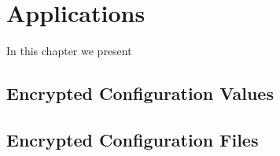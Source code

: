 \chapter{Applications}

In this chapter we present

\section{Encrypted Configuration Values}



\section{Encrypted Configuration Files}


